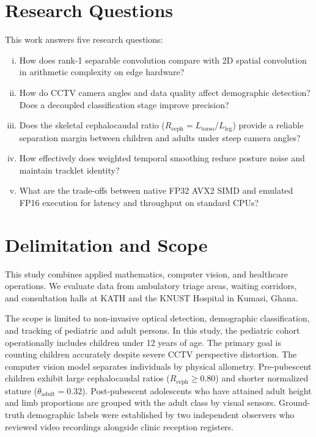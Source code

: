 \section{Research Questions}
This work answers five research questions:
\begin{enumerate}[(i)]
    \item How does rank-1 separable convolution compare with 2D spatial convolution in arithmetic complexity on edge hardware?
    \item How do CCTV camera angles and data quality affect demographic detection? Does a decoupled classification stage improve precision?
    \item Does the skeletal cephalocaudal ratio ($R_{\text{ceph}} = L_{\text{torso}} / L_{\text{leg}}$) provide a reliable separation margin between children and adults under steep camera angles?
    \item How effectively does weighted temporal smoothing reduce posture noise and maintain tracklet identity?
    \item What are the trade-offs between native FP32 AVX2 SIMD and emulated FP16 execution for latency and throughput on standard CPUs?
\end{enumerate}

\section{Delimitation and Scope}
This study combines applied mathematics, computer vision, and healthcare operations. We evaluate data from ambulatory triage areas, waiting corridors, and consultation halls at KATH and the KNUST Hospital in Kumasi, Ghana.

The scope is limited to non-invasive optical detection, demographic classification, and tracking of pediatric and adult persons. In this study, the pediatric cohort operationally includes children under 12 years of age. The primary goal is counting children accurately despite severe CCTV perspective distortion. The computer vision model separates individuals by physical allometry. Pre-pubescent children exhibit large cephalocaudal ratios ($R_{\text{ceph}} \ge 0.80$) and shorter normalized stature ($\theta_{\text{adult}} = 0.32$). Post-pubescent adolescents who have attained adult height and limb proportions are grouped with the adult class by visual sensors. Ground-truth demographic labels were established by two independent observers who reviewed video recordings alongside clinic reception registers.

